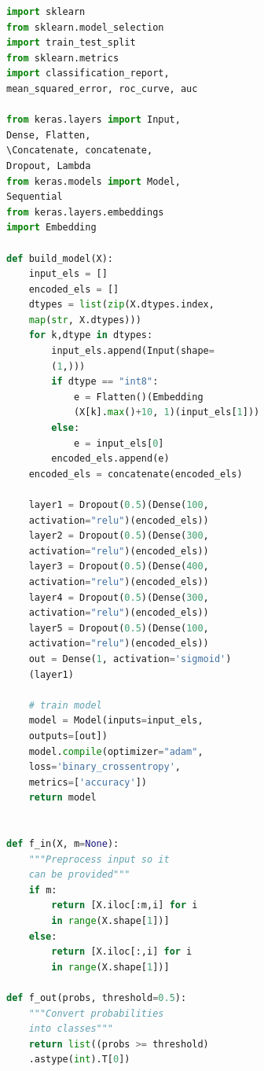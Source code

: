 \documentclass[jou,apacite]{apa6}
\begin{document}
\begin{lstlisting}[language=Python]
import sklearn
from sklearn.model_selection 
import train_test_split
from sklearn.metrics 
import classification_report, 
mean_squared_error, roc_curve, auc

from keras.layers import Input, 
Dense, Flatten, 
\Concatenate, concatenate, 
Dropout, Lambda
from keras.models import Model, 
Sequential
from keras.layers.embeddings 
import Embedding

def build_model(X):
    input_els = []
    encoded_els = []
    dtypes = list(zip(X.dtypes.index, 
    map(str, X.dtypes)))
    for k,dtype in dtypes:
        input_els.append(Input(shape=
        (1,)))
        if dtype == "int8":
            e = Flatten()(Embedding
            (X[k].max()+10, 1)(input_els[1]))
        else:
            e = input_els[0]
        encoded_els.append(e)
    encoded_els = concatenate(encoded_els)

    layer1 = Dropout(0.5)(Dense(100, 
    activation="relu")(encoded_els))
    layer2 = Dropout(0.5)(Dense(300, 
    activation="relu")(encoded_els))
    layer3 = Dropout(0.5)(Dense(400, 
    activation="relu")(encoded_els))
    layer4 = Dropout(0.5)(Dense(300, 
    activation="relu")(encoded_els))
    layer5 = Dropout(0.5)(Dense(100, 
    activation="relu")(encoded_els))
    out = Dense(1, activation='sigmoid')
    (layer1)

    # train model
    model = Model(inputs=input_els, 
    outputs=[out])
    model.compile(optimizer="adam", 
    loss='binary_crossentropy', 
    metrics=['accuracy'])
    return model


def f_in(X, m=None):
    """Preprocess input so it 
    can be provided"""
    if m:
        return [X.iloc[:m,i] for i 
        in range(X.shape[1])]
    else:
        return [X.iloc[:,i] for i 
        in range(X.shape[1])]

def f_out(probs, threshold=0.5):
    """Convert probabilities 
    into classes"""
    return list((probs >= threshold)
    .astype(int).T[0])
\end{lstlisting}
\end{document}
